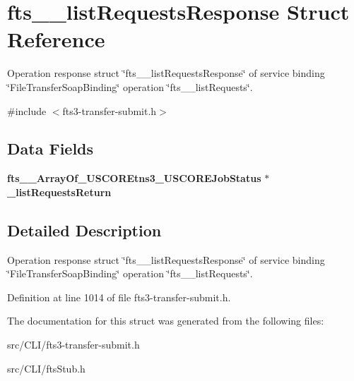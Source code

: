 \section{fts\_\-\_\-listRequestsResponse Struct Reference}
\label{structfts____listRequestsResponse}


Operation response struct \char`\"{}fts\_\-\_\-listRequestsResponse\char`\"{} of service binding \char`\"{}FileTransferSoapBinding\char`\"{} operation \char`\"{}fts\_\-\_\-listRequests\char`\"{}.  




{\ttfamily \#include $<$fts3-\/transfer-\/submit.h$>$}

\subsection*{Data Fields}
\begin{DoxyCompactItemize}
\item 
{\bf fts\_\-\_\-ArrayOf\_\-USCOREtns3\_\-USCOREJobStatus} $\ast$ {\bfseries \_\-listRequestsReturn}\label{structfts____listRequestsResponse_a70bf4c12419e1121dec645c322e0468a}

\end{DoxyCompactItemize}


\subsection{Detailed Description}
Operation response struct \char`\"{}fts\_\-\_\-listRequestsResponse\char`\"{} of service binding \char`\"{}FileTransferSoapBinding\char`\"{} operation \char`\"{}fts\_\-\_\-listRequests\char`\"{}. 

Definition at line 1014 of file fts3-\/transfer-\/submit.h.



The documentation for this struct was generated from the following files:\begin{DoxyCompactItemize}
\item 
src/CLI/fts3-\/transfer-\/submit.h\item 
src/CLI/ftsStub.h\end{DoxyCompactItemize}
